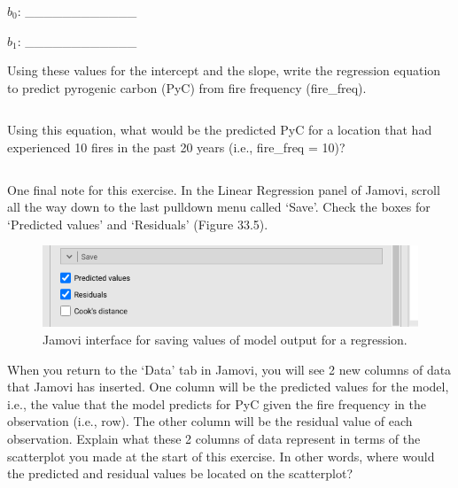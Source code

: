 \documentclass[
]{scrbook}
\begin{document}
\(b_{0}\): \_\_\_\_\_\_\_\_\_\_\_\_

\(b_{1}\): \_\_\_\_\_\_\_\_\_\_\_\_

Using these values for the intercept and the slope, write the regression equation to predict pyrogenic carbon (PyC) from fire frequency (fire\_freq).

\begin{verbatim}

\end{verbatim}

Using this equation, what would be the predicted PyC for a location that had experienced 10 fires in the past 20 years (i.e., fire\_freq = 10)?

\begin{verbatim}

\end{verbatim}

One final note for this exercise.
In the Linear Regression panel of Jamovi, scroll all the way down to the last pulldown menu called `Save'.
Check the boxes for `Predicted values' and `Residuals' (Figure 33.5).

\begin{figure}
\includegraphics[width=1\linewidth]{img/Jamovi_linear_regression_save} \caption{Jamovi interface for saving values of model output for a regression.}\label{fig:unnamed-chunk-178}
\end{figure}

When you return to the `Data' tab in Jamovi, you will see 2 new columns of data that Jamovi has inserted.
One column will be the predicted values for the model, i.e., the value that the model predicts for PyC given the fire frequency in the observation (i.e., row).
The other column will be the residual value of each observation.
Explain what these 2 columns of data represent in terms of the scatterplot you made at the start of this exercise.
In other words, where would the predicted and residual values be located on the scatterplot?

\begin{verbatim}




\end{verbatim}
\end{document}
